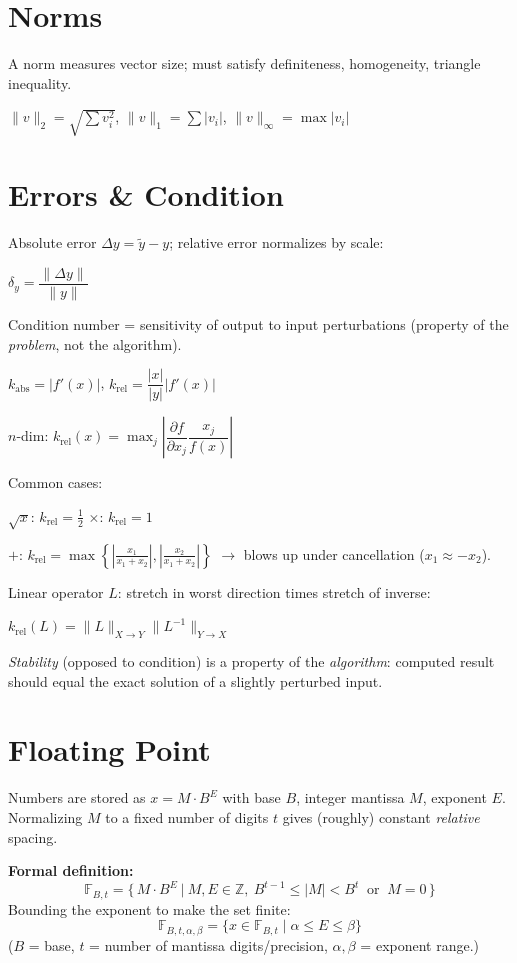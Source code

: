 \documentclass[11pt]{extarticle}
\begin{document}
\section{Norms}
A norm measures vector size; must satisfy definiteness, homogeneity, triangle inequality.

$\|v\|_2=\sqrt{\sum v_i^2}$, $\|v\|_1=\sum|v_i|$, $\|v\|_\infty=\max|v_i|$

\section{Errors \& Condition}
Absolute error $\Delta y=\tilde y-y$; relative error normalizes by scale:

$\delta_y=\dfrac{\|\Delta y\|}{\|y\|}$

Condition number = sensitivity of output to input perturbations (property of the \emph{problem}, not the algorithm).

$k_{\text{abs}}=|f'(x)|$, \quad $k_{\text{rel}}=\dfrac{|x|}{|y|}|f'(x)|$

$n$-dim: $k_{\text{rel}}(x)=\max_j\left|\dfrac{\partial f}{\partial x_j}\dfrac{x_j}{f(x)}\right|$

Common cases:

$\sqrt{x}$: $k_{\text{rel}}=\tfrac12$ \quad $\times$: $k_{\text{rel}}=1$

$+$: $k_{\text{rel}}=\max\left\{\left|\tfrac{x_1}{x_1+x_2}\right|,\left|\tfrac{x_2}{x_1+x_2}\right|\right\}$ $\to$ blows up under cancellation ($x_1\approx -x_2$).

Linear operator $L$: stretch in worst direction times stretch of inverse:

$k_{\text{rel}}(L)=\|L\|_{X\to Y}\|L^{-1}\|_{Y\to X}$

\emph{Stability} (opposed to condition) is a property of the \emph{algorithm}: computed result should equal the exact solution of a slightly perturbed input.

\section{Floating Point}
Numbers are stored as $x=M\cdot B^E$ with base $B$, integer mantissa $M$, exponent $E$. Normalizing $M$ to a fixed number of digits $t$ gives (roughly) constant \emph{relative} spacing.

\textbf{Formal definition:}
\[
\mathbb F_{B,t}=\Big\{\,M\cdot B^E \ \Big|\ M,E\in\mathbb Z,\ B^{t-1}\le|M|<B^t\ \text{ or }\ M=0\,\Big\}
\]
Bounding the exponent to make the set finite:
\[
\mathbb F_{B,t,\alpha,\beta}=\{x\in\mathbb F_{B,t}\mid \alpha\le E\le \beta\}
\]
($B$ = base, $t$ = number of mantissa digits/precision, $\alpha,\beta$ = exponent range.)
\end{document}
